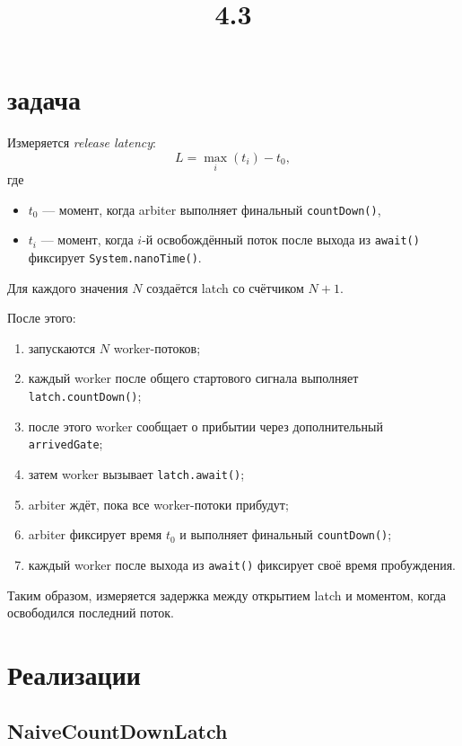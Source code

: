 \documentclass[12pt]{article}
\title{4.3}
\author{}
\date{}
\begin{document}
\maketitle

\section*{ задача}

Измеряется \textit{release latency}:
\[
L = \max_i(t_i) - t_0,
\]
где
\begin{itemize}
    \item $t_0$ --- момент, когда arbiter выполняет финальный \texttt{countDown()},
    \item $t_i$ --- момент, когда $i$-й освобождённый поток после выхода из \texttt{await()} фиксирует \texttt{System.nanoTime()}.
\end{itemize}

Для каждого значения $N$ создаётся latch со счётчиком $N + 1$.

После этого:
\begin{enumerate}
    \item запускаются $N$ worker-потоков;
    \item каждый worker после общего стартового сигнала выполняет \texttt{latch.countDown()};
    \item после этого worker сообщает о прибытии через дополнительный \texttt{arrivedGate};
    \item затем worker вызывает \texttt{latch.await()};
    \item arbiter ждёт, пока все worker-потоки прибудут;
    \item arbiter фиксирует время $t_0$ и выполняет финальный \texttt{countDown()};
    \item каждый worker после выхода из \texttt{await()} фиксирует своё время пробуждения.
\end{enumerate}

Таким образом, измеряется задержка между открытием latch и моментом, когда освободился последний поток.

\section*{Реализации}

\subsection*{NaiveCountDownLatch}
\end{document}
